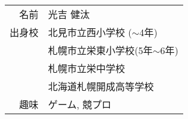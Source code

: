 \documentclass[main]{subfiles}
\begin{document}
\begin{frame}
	\begin{tabular}{rl}\\
		名前 & 光吉 健汰 \\
		出身校 & 北見市立西小学校 ($\sim$4年)\\
			   &	札幌市立栄東小学校(5年$\sim$6年)\\
				&	札幌市立栄中学校 \\
			&	北海道札幌開成高等学校 \\
		趣味 & ゲーム, 競プロ  \\
	\end{tabular}
\end{frame}
\end{document}
